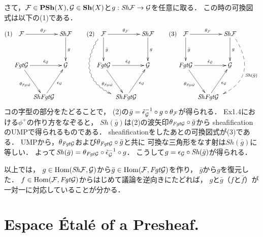 \documentclass[a4paper]{jsarticle}
\newcommand{\Sh}{\mathbf{Sh}}
\newcommand{\PSh}{\mathbf{PSh}}
\newcommand{\ftorSh}{\mathit{Sh}}
\newcommand{\ftorFgt}{\mathit{Fgt}}
\begin{document}
    さて，$\shF \in \PSh(X), \shG \in \Sh(X)$と$g: \ftorSh \shF \to \shG$を任意に取る．
    この時の可換図式は以下の(1)である．
    \[
    (1)
    \xymatrix@C=2pt@R=35pt
    {
    \shF \ar[rr]^{\theta_{\shF}} & {} & \ftorSh \shF \ar[d]^{g} \\
    \ftorFgt \shG \ar@{->}[rr]^-{\tilde{\epsilon}_{\shG}} \ar[rd]_-{\theta_{\ftorFgt \shG}} & {} & \shG \\
    {} & \ftorSh \ftorFgt \shG \ar[ru]_-{\epsilon_{\shG}} & {}
    }
    \hspace{20pt}
    (2)
    \xymatrix@C=2pt@R=35pt
    {
    \shF \ar[rr]^{\theta_{\shF}} \ar[d]^{\bar{g}} \ar@<-2mm>@/_12mm/@{~>}[rdd] & {} & \ftorSh \shF \ar[d]^{g} \\
    \ftorFgt \shG \ar@{->}[rr]^-{\tilde{\epsilon}_{\shG}} \ar[rd]_-{\theta_{\ftorFgt \shG}} & {} & \shG \\
    {} & \ftorSh \ftorFgt \shG \ar[ru]_-{\epsilon_{\shG}} & {}
    }
    \hspace{20pt}
    (3)
    \xymatrix@C=2pt@R=35pt
    {
    \shF \ar[rr]^{\theta_{\shF}} \ar[d]^{\bar{g}} & {} & \ftorSh \shF \ar[d]^{g} \ar@<2mm>@/^12mm/@{-->}[ldd]^{\ftorSh(\bar{g})} \\
    \ftorFgt \shG \ar@{->}[rr]^-{\tilde{\epsilon}_{\shG}} \ar[rd]_-{\theta_{\ftorFgt \shG}} & {} & \shG \\
    {} & \ftorSh \ftorFgt \shG \ar[ru]_-{\epsilon_{\shG}} & {}
    }
    \]
    コの字型の部分をたどることで，
    (2)の$\bar{g}=\tilde{\epsilon}_{\mathcal{G}}^{-1} \circ g \circ \theta_{\mathcal{F}}$が得られる．
    Ex1.4における$\phi^+$の作り方をなぞると，
    $\ftorSh(\bar{g})$は(2)の波矢印$\theta_{\ftorFgt \shG} \circ \bar{g}$から
    sheafificationのUMPで得られるものである．
    sheafificationをしたあとの可換図式が(3)である．
    UMPから，$\theta_{\ftorFgt \shG}$および$\theta_{\ftorFgt \shG} \circ \bar{g}$と共に
    可換な三角形をなす射は$\ftorSh(\bar{g})$に等しい．
    よって$\ftorSh(\bar{g})=\theta_{\ftorFgt \shG} \circ \tilde{\epsilon}_{\shG}^{-1} \circ g$．
    こうして$g=\epsilon_{\shG} \circ \ftorSh(\bar{g})$が得られる．

    以上では，
    $g \in \Hom(\ftorSh \shF, \shG)$から$\bar{g} \in \Hom(\shF, \ftorFgt \shG)$を作り，
    $\bar{g}$から$g$を復元した．
    $f \in \Hom(\shF, \ftorFgt \shG)$からはじめて議論を逆向きにたどれば，
    $g$と$\bar{g}$（$f$と$\bar{f}$）が一対一に対応していることが分かる．

\section{Espace \'Etal\'e of a Presheaf.} %
\end{document}
